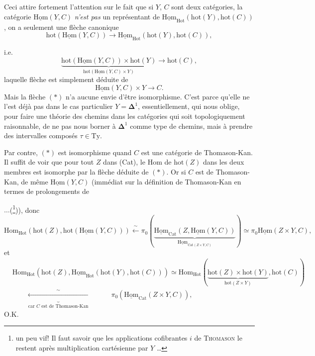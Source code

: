 \documentclass[11pt]{article}
\newcommand{\printedpage}[1]{\marginpar{\footnotesize p.~#1}}
\newcommand{\msp}[1]{\marginpar{\footnotesize [#1]}}
\newcommand{\Hot}{\mathrm{Hot}}
\newcommand{\uHom}{\underline{\mathrm{Hom}}}
\newcommand{\hot}{\mathrm{hot}}
\begin{document}
Ceci attire fortement l'attention sur le fait que si $Y$, $C$ sont deux catégories, la catégorie $\uHom(Y,C)$ \textit{n'est pas} un représentant de $\uHom_{\Hot}(\mathrm{hot}(Y),\mathrm{hot}(C))$, on a seulement une flèche canonique
\[ \mathrm{hot}(\uHom(Y,C)) \longrightarrow \uHom_{\Hot}(\mathrm{hot}(Y),\mathrm{hot}(C)), \tag*{$(*)$} \]

\printedpage{84}

i.e.
\[
\underbrace{\hot(\uHom(Y,C))\times\hot(Y)}_{\hot(\uHom(Y,C)\times Y)}\longrightarrow\hot(C),
\]
laquelle flèche est simplement déduite de
\[
\uHom(Y,C)\times Y\longrightarrow C.
\]
Mais la flèche $(*)$ n'a aucune envie d'être isomorphisme. C'est parce qu'elle ne l'est déjà pas dans le cas particulier $Y=\mathbf{\Delta}^1$, essentiellement, qui nous oblige, pour faire une théorie des chemins dans les catégories qui soit topologiquement raisonnable, de ne pas nous borner à $\mathbf{\Delta}^1$ comme type de chemins, mais à prendre des intervalles composés $\tau\in\mathrm{Ty}$.

\msp{page 136}

Par contre, $(*)$ est isomorphisme quand $C$ est une catégorie de Thomason-Kan. Il suffit de voir que pour tout $Z$ dans (Cat), le Hom de $\hot(Z)$ dans les deux membres est isomorphe par la flèche déduite de $(*)$. Or si $C$ est de Thomason-Kan, de même $\uHom(Y,C)$ (immédiat sur la définition de Thomason-Kan en termes de prolongements de
$\ldots$(\footnote[29]{un peu vif! Il faut savoir que les applications cofibrantes $i$ de \textsc{Thomason} le restent après multiplication cartésienne par $Y$ \ldots})), donc
\[
\mathrm{Hom}_{\mathrm{Hot}}(\hot(Z),\hot(\uHom(Y,C)))\xleftarrow{\ \sim\ }\pi_0(\underbrace{\uHom_{\mathrm{Cat}}(Z,\uHom(Y,C))}_{\uHom_{\mathrm{Cat}(Z\times Y,C)}})\simeq\pi_0\uHom(Z\times Y,C), %
\]
et
\[
\begin{aligned}
&\mathrm{Hom}_{\mathrm{Hot}}(\hot(Z),\uHom_{\mathrm{Hot}}(\hot(Y),\hot(C)))\simeq\mathrm{Hom}_{\mathrm{Hot}}(\underbrace{\hot(Z)\times\hot(Y)}_{\hot(Z\times Y)},\hot(C))\\
&\qquad\underbrace{\xleftarrow{\ \sim\ }}_{\text{car $C$ est de Thomason-Kan}}\qquad\quad\pi_0(\uHom_{\mathrm{Cat}}(Z\times Y,C)),
\end{aligned}
\]
O.K.
\end{document}
